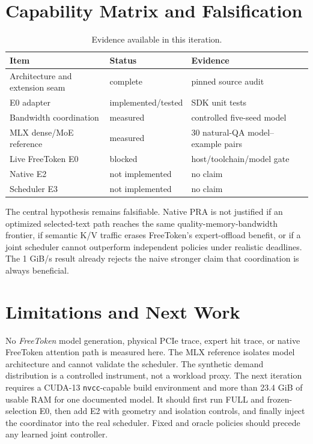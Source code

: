 \documentclass[10pt]{article}
\begin{document}
\section{Capability Matrix and Falsification}
\begin{table}[h]
\centering\small
\caption{Evidence available in this iteration.}
\begin{tabular}{lll}
\toprule Item & Status & Evidence\\
\midrule
Architecture and extension seam & complete & pinned source audit\\
E0 adapter & implemented/tested & SDK unit tests\\
Bandwidth coordination & measured & controlled five-seed model\\
MLX dense/MoE reference & measured & 30 natural-QA model--example pairs\\
Live FreeToken E0 & blocked & host/toolchain/model gate\\
Native E2 & not implemented & no claim\\
Scheduler E3 & not implemented & no claim\\
\bottomrule
\end{tabular}
\end{table}

The central hypothesis remains falsifiable. Native PRA is not justified if an
optimized selected-text path reaches the same quality-memory-bandwidth frontier,
if semantic K/V traffic erases FreeToken's expert-offload benefit, or if a joint
scheduler cannot outperform independent policies under realistic deadlines.
The 1 GiB/s result already rejects the naive stronger claim that coordination is
always beneficial.

\section{Limitations and Next Work}
No \emph{FreeToken} model generation, physical PCIe trace, expert hit trace, or
native FreeToken attention path is measured here. The MLX reference isolates
model architecture and cannot validate the scheduler. The synthetic demand
distribution is a controlled instrument, not a workload proxy. The next iteration requires a
CUDA-13 \texttt{nvcc}-capable build environment and more than 23.4 GiB of usable
RAM for one documented model. It should
first run FULL and frozen-selection E0, then add E2 with geometry and isolation
controls, and finally inject the coordinator into the real scheduler. Fixed and
oracle policies should precede any learned joint controller.
\end{document}
